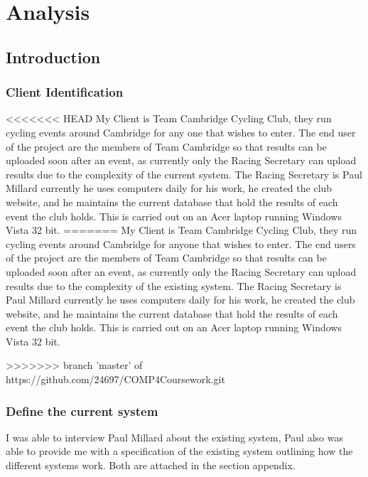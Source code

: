 \chapter{Analysis}

\section{Introduction}

\subsection{Client Identification}
<<<<<<< HEAD
My Client is Team Cambridge Cycling Club, they run cycling events around Cambridge for any one that wishes to enter. The end user of the project are the members of Team Cambridge so that results can be uploaded soon after an event, as currently only the Racing Secretary can upload results due to the complexity of the current system. The Racing Secretary is Paul Millard currently he uses computers daily for his work, he created the club website, and he maintains the current database that hold the results of each event the club holds. This is carried out on an Acer laptop running Windows Vista 32 bit.
=======
My Client is Team Cambridge Cycling Club, they run cycling events around Cambridge for anyone that wishes to enter. The end users of the project are the members of Team Cambridge so that results can be uploaded soon after an event, as currently only the Racing Secretary can upload results due to the complexity of the existing system. The Racing Secretary is Paul Millard currently he uses computers daily for his work, he created the club website, and he maintains the current database that hold the results of each event the club holds. This is carried out on an Acer laptop running Windows Vista 32 bit.

>>>>>>> branch 'master' of https://github.com/24697/COMP4Coursework.git
\subsection{Define the current system}
I was able to interview Paul Millard about the existing system, Paul also was able to provide me with a specification of the existing system outlining how the different systems work. Both are attached in the section appendix.

